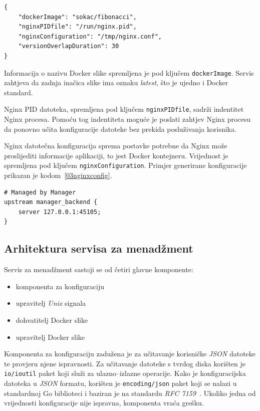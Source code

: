 \begin{lstlisting}[float=h]
{
    "dockerImage": "sokac/fibonacci",
    "nginxPIDfile": "/run/nginx.pid",
    "nginxConfiguration": "/tmp/nginx.conf",
    "versionOverlapDuration": 30
}

\end{lstlisting}

Informacija o nazivu Docker slike spremljena je pod ključem \texttt{dockerImage}. Servis
zahtjeva da zadnja inačica slike ima oznaku \textit{latest}, što je ujedno i Docker standard.

Nginx PID datoteka, spremljena pod ključem \texttt{nginxPIDfile}, sadrži indentitet Nginx procesa.
Pomoću tog indentiteta moguće je poslati zahtjev Nginx procesu da ponovno učita konfiguracije
datoteke bez prekida posluživanja korisnika.

Nginx datotečna konfiguracija sprema postavke potrebne da Nginx može proslijediti informacije
aplikaciji, to jest Docker kontejneru. Vrijednost je spremljena pod ključem
\texttt{nginxConfiguration}. Primjer generirane konfiguracije prikazan je
kodom~\ref{03nginxconfig}.

\begin{lstlisting}[float=h]
# Managed by Manager
upstream manager_backend {
    server 127.0.0.1:45105;
}
\end{lstlisting}

\subsection{Arhitektura servisa za menadžment}
Servis za menadžment sastoji se od četiri glavne komponente:
\begin{itemize}
    \item komponenta za konfiguraciju
    \item upravitelj \textit{Unix} signala
    \item dohvatitelj Docker slike
    \item upravitelj Docker slike
\end{itemize}

Komponenta za konfiguraciju zadužena je za učitavanje korisničke \textit{JSON} datoteke te provjeru
njene ispravnosti. Za učitavanje datoteke s tvrdog diska korišten je \texttt{io/ioutil} paket koji
služi za ulazno--izlazne operacije. Kako je konfiguracijska datoteka u \textit{JSON} formatu,
korišten je \texttt{encoding/json} paket koji se nalazi u standardnoj Go biblioteci i baziran je na
standardu \textit{RFC 7159}~\citep{bray2017javascript}. Ukoliko jedna od vrijednosti konfiguracije
nije ispravna, komponenta vraća grešku.

